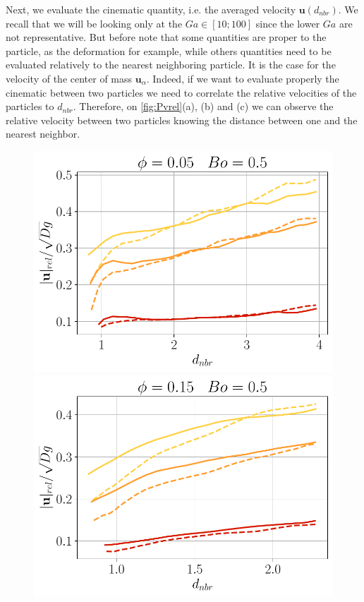 Next, we evaluate the cinematic quantity, i.e. the averaged velocity $\bm{u}(d_{nbr})$. 
We recall that we will be looking only at the $Ga \in [10;100]$ since the lower $Ga$ are not representative. 
But before note that some quantities are proper to the particle, as the deformation for example, while others quantities need to be evaluated relatively to the nearest neighboring particle. 
It is the case for the velocity of the center of mass $\bm{u}_\alpha$.
Indeed, if we want to evaluate properly the cinematic between two particles we need to correlate the relative velocities of the particles to $d_{nbr}$. 
Therefore, on \ref{fig:Pvrel}(a), (b) and (c) we can observe the relative velocity between two particles knowing the distance between one and the nearest neighbor. 
    \begin{figure}[h!]
        \centering
        \includegraphics[height=0.16\textheight]{image/N_10/Pcond/probav_relBo0_5PHI0_05.pdf}
        \includegraphics[height=0.16\textheight]{image/N_10/Pcond/probav_relBo0_5PHI0_15.pdf}

\end{figure}
